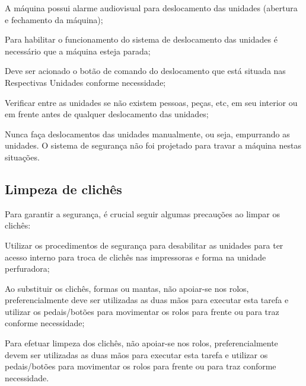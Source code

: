 \begin{generalSafetyToMoveUnities}
    \item[\ding{\dingNumber}] A máquina possui alarme audiovisual para deslocamento das unidades (abertura e fechamento da máquina);
    \item[\ding{\dingNumber}] Para habilitar o funcionamento do sistema de deslocamento das unidades é necessário que a máquina esteja
parada;
    \item[\ding{\dingNumber}] Deve ser acionado o botão de comando do deslocamento que está situada nas Respectivas Unidades conforme
necessidade;
    \item[\ding{\dingNumber}] Verificar entre as unidades se não existem pessoas, peças, etc, em seu interior ou em frente antes de qualquer
deslocamento das unidades;
    \item[\ding{\dingNumber}] Nunca faça deslocamentos das unidades manualmente, ou seja, empurrando as unidades. O sistema de
segurança não foi projetado para travar a máquina nestas situações.

\end{generalSafetyToMoveUnities}

\subsection{Limpeza de clichês}

Para garantir a segurança, é crucial seguir algumas precauções ao limpar os clichês:

\begin{generalRulesToPlateCleaning}
\item[\ding{\dingNumber}] Utilizar os procedimentos de segurança para desabilitar as unidades para ter acesso interno para troca de
clichês nas impressoras e forma na unidade perfuradora;
\item[\ding{\dingNumber}] Ao substituir os clichês, formas ou mantas, não apoiar-se nos rolos, preferencialmente deve ser utilizadas as
duas mãos para executar esta tarefa e utilizar os pedais/botões para movimentar os rolos para frente ou para traz
conforme necessidade;
\item[\ding{\dingNumber}] Para efetuar limpeza dos clichês, não apoiar-se nos rolos, preferencialmente devem ser utilizadas as duas mãos
para executar esta tarefa e utilizar os pedais/botões para movimentar os rolos para frente ou para traz conforme
necessidade.
\end{generalRulesToPlateCleaning}

